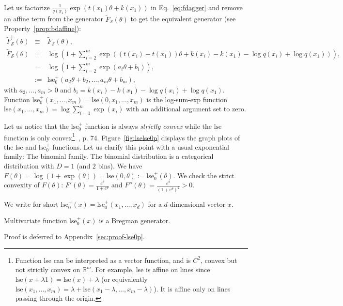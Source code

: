 \documentclass[graybox]{svmult}
\def\lse{\mathrm{lse}}
\def\eqdef{:=}
\def\tildeF{\tilde{F}}
\def\bbR{\mathbb{R}}
\def\calS{\mathcal{S}}
\begin{document}
Let us factorize $\frac{1}{q(x_1)} \exp(t(x_1)\theta+k(x_1))$ in Eq.~\ref{eq:fdagger} and remove an affine term from the generator $\tildeF_\calS(\theta)$ to get the equivalent generator (see Property~\ref{prop:bdaffine}):
\begin{eqnarray}
\tildeF_\calS^\dagger(\theta)  &\equiv& \tildeF_\calS(\theta),\\
\tildeF_\calS(\theta) &=&\log \left(1+ \sum_{i=2}^m \exp((t(x_i)-t(x_1))\theta+k(x_i)-k(x_1)-\log q(x_i)+\log q(x_1)) \right),\\
&=&\log \left(1+ \sum_{i=2}^m \exp(a_i\theta+b_i)\right),\\
&\eqdef& \lse_0^+(a_2\theta+b_2, \ldots, a_m\theta+b_m),\label{eq:gexpf}
\end{eqnarray}
with $a_2,\ldots, a_m>0$ and $b_i=k(x_i)-k(x_1)-\log q(x_i)+\log q(x_1)$.
Function $\lse_0^+(x_1,\ldots,x_m)=\lse(0,x_1,\ldots,x_m)$ is the log-sum-exp function~\cite{lse-2016,lse-2017} $\lse(x_1,\ldots, x_m)=\log \sum_{i=1}^n \exp(x_i)$ with an additional argument set to zero.
 


Let us notice that the $\lse_0^+$ function is always {\em strictly convex} while the $\lse$ function is only convex\footnote{
Function lse can be interpreted as a vector function, and is  $C^2$, convex but not strictly convex on $\bbR^m$. 
For example, lse is affine on lines   since $\lse(x+\lambda 1)=\lse(x)+\lambda$ (or equivalently $\lse(x_1,\ldots, x_m)=\lambda + \lse(x_1-\lambda,\ldots,x_m-\lambda)$). It is affine only on lines passing through the origin.}~\cite{Boyd-2004}, p. 74.
Figure~\ref{fig:lselse0p} displays the graph plots of the lse and $\lse_0^+$ functions.
Let us clarify this point with a usual exponential family: The binomial family.
The binomial distribution is a categorical distribution with $D=1$ (and $2$ bins). 
We have $F(\theta)=\log(1+\exp(\theta))=\lse(0,\theta)\eqdef\lse_0^+(\theta)$.
We check the strict convexity of $F(\theta)$: $F'(\theta)=\frac{e^\theta}{1+e^\theta}$ and $F''(\theta)=\frac{e^\theta}{(1+e^\theta)^2}>0$.


We write for short $\lse_0^+(x)=\lse_0^+(x_1,\ldots, x_d)$ for a $d$-dimensional vector $x$.

\begin{theorem}[$\lse_0^+$ is a Bregman generator]\label{thm:lse0pBF}
Multivariate function $\lse_0^+(x)$ is a Bregman generator.
\end{theorem} 

Proof is deferred to Appendix~\ref{sec:proof-lse0p}.
 
\end{document}

